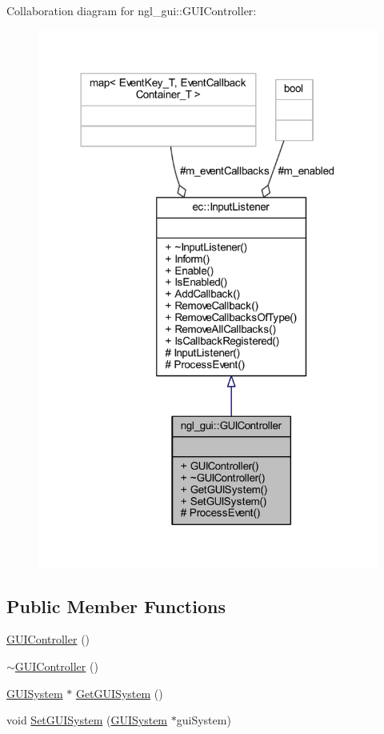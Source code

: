 Collaboration diagram for ngl\+\_\+gui\+:\+:G\+U\+I\+Controller\+:
\nopagebreak
\begin{figure}[H]
\begin{center}
\leavevmode
\includegraphics[width=318pt]{classngl__gui_1_1_g_u_i_controller__coll__graph}
\end{center}
\end{figure}
\subsection*{Public Member Functions}
\begin{DoxyCompactItemize}
\item 
\mbox{\hyperlink{classngl__gui_1_1_g_u_i_controller_ac6fe96782bdf72d10859c0a68caf411c}{G\+U\+I\+Controller}} ()
\item 
\mbox{\hyperlink{classngl__gui_1_1_g_u_i_controller_a729c3ba7e7932d954db59172f435e745}{$\sim$\+G\+U\+I\+Controller}} ()
\item 
\mbox{\hyperlink{classngl__gui_1_1_g_u_i_system}{G\+U\+I\+System}} $\ast$ \mbox{\hyperlink{classngl__gui_1_1_g_u_i_controller_a99ed84b859cb86d7d57f1904003a0e16}{Get\+G\+U\+I\+System}} ()
\item 
void \mbox{\hyperlink{classngl__gui_1_1_g_u_i_controller_a5ec3f78019d228572f5797521d5d0507}{Set\+G\+U\+I\+System}} (\mbox{\hyperlink{classngl__gui_1_1_g_u_i_system}{G\+U\+I\+System}} $\ast$gui\+System)
\end{DoxyCompactItemize}

